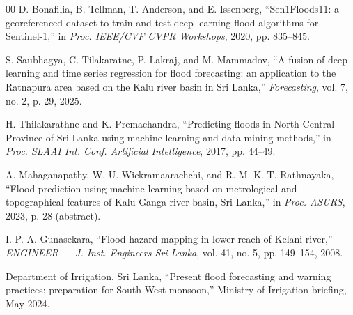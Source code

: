 \documentclass[conference]{IEEEtran}
\begin{document}
\begin{thebibliography}{00}
 D. Bonafilia, B. Tellman, T. Anderson, and E. Issenberg,
``Sen1Floods11: a georeferenced dataset to train and test deep learning flood
algorithms for Sentinel-1,'' in \emph{Proc. IEEE/CVF CVPR Workshops}, 2020,
pp. 835--845.

 S. Saubhagya, C. Tilakaratne, P. Lakraj, and
M. Mammadov, ``A fusion of deep learning and time series regression for flood
forecasting: an application to the Ratnapura area based on the Kalu river basin
in Sri Lanka,'' \emph{Forecasting}, vol. 7, no. 2, p. 29, 2025.

 H. Thilakarathne and K. Premachandra, ``Predicting
floods in North Central Province of Sri Lanka using machine learning and data
mining methods,'' in \emph{Proc. SLAAI Int. Conf. Artificial Intelligence}, 2017,
pp. 44--49.

 A. Mahaganapathy, W. U. Wickramaarachchi, and
R. M. K. T. Rathnayaka, ``Flood prediction using machine learning based on
metrological and topographical features of Kalu Ganga river basin, Sri Lanka,''
in \emph{Proc. ASURS}, 2023, p. 28 (abstract).

 I. P. A. Gunasekara, ``Flood hazard mapping in lower
reach of Kelani river,'' \emph{ENGINEER --- J. Inst. Engineers Sri Lanka},
vol. 41, no. 5, pp. 149--154, 2008.

 Department of Irrigation, Sri Lanka, ``Present flood
forecasting and warning practices: preparation for South-West monsoon,''
Ministry of Irrigation briefing, May 2024.

\end{thebibliography}
\end{document}
